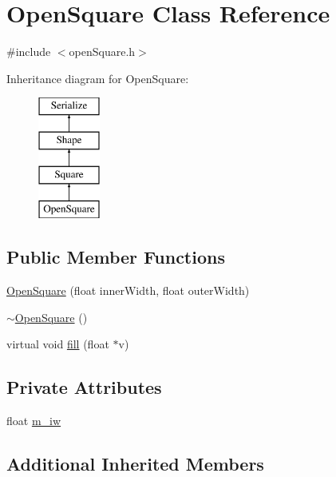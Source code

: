 \hypertarget{classOpenSquare}{\section{Open\-Square Class Reference}
\label{classOpenSquare}
}


{\ttfamily \#include $<$open\-Square.\-h$>$}

Inheritance diagram for Open\-Square\-:\begin{figure}[H]
\begin{center}
\leavevmode
\includegraphics[height=4.000000cm]{classOpenSquare}
\end{center}
\end{figure}
\subsection*{Public Member Functions}
\begin{DoxyCompactItemize}
\item 
\hyperlink{classOpenSquare_a7910e72901054938e84f273856a6a6b9}{Open\-Square} (float inner\-Width, float outer\-Width)
\item 
\hyperlink{classOpenSquare_a9e55d8c84ccc048eac82bcb0c2ec651a}{$\sim$\-Open\-Square} ()
\item 
virtual void \hyperlink{classOpenSquare_aa75c880448b327596b0b5fbde69e561c}{fill} (float $\ast$v)
\end{DoxyCompactItemize}
\subsection*{Private Attributes}
\begin{DoxyCompactItemize}
\item 
float \hyperlink{classOpenSquare_ae85dd099f8da8e1d0b8486067632006a}{m\-\_\-iw}
\end{DoxyCompactItemize}
\subsection*{Additional Inherited Members}


